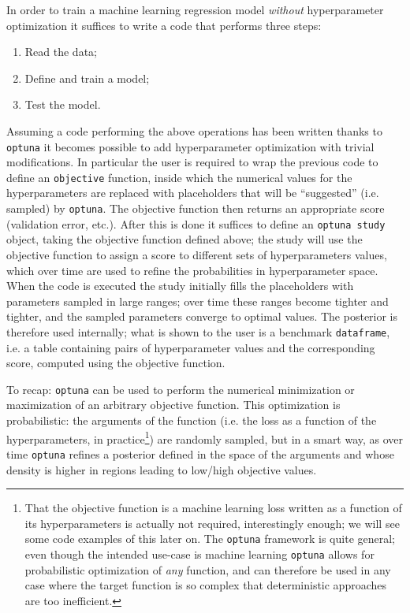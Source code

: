 In order to train a machine learning regression model \emph{without} hyperparameter optimization it suffices to write a code that performs three steps:
\begin{enumerate}
    \item Read the data;
    \item Define and train a model;
    \item Test the model.
\end{enumerate}
Assuming a code performing the above operations has been written thanks to \texttt{optuna} it becomes possible to add hyperparameter optimization with trivial modifications. In particular the user is required to wrap the previous code to define an \texttt{objective} function, inside which the numerical values for the hyperparameters are replaced with placeholders that will be ``suggested'' (i.e. sampled) by \texttt{optuna}. The objective function then returns an appropriate score (validation error, etc.). After this is done it suffices to define an \texttt{optuna study} object, taking the objective function defined above; the study will use the objective function to assign a score to different sets of hyperparameters values, which over time are used to refine the probabilities in hyperparameter space.
When the code is executed the study initially fills the placeholders with parameters sampled in large ranges; over time these ranges become tighter and tighter, and the sampled parameters converge to optimal values. The posterior is therefore used internally; what is shown to the user is a benchmark \texttt{dataframe}, i.e. a table containing pairs of hyperparameter values and the corresponding score, computed using the objective function.

To recap: \texttt{optuna} can be used to perform the numerical minimization or maximization of an arbitrary objective function. This optimization is probabilistic: the arguments of the function (i.e. the loss as a function of the hyperparameters, in practice\footnote{That the objective function is a machine learning loss written as a function of its hyperparameters is actually not required, interestingly enough; we will see some code examples of this later on. The \texttt{optuna} framework is quite general; even though the intended use-case is machine learning \texttt{optuna} allows for probabilistic optimization of \emph{any} function, and can therefore be used in any case where the target function is so complex that deterministic approaches are too inefficient.}) are randomly sampled, but in a smart way, as over time \texttt{optuna} refines a posterior defined in the space of the arguments and whose density is higher in regions leading to low/high objective values.

